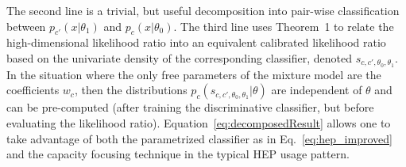 \documentclass[aoas,preprint]{imsart}
\numberwithin{equation}{section}
\theoremstyle{plain}
\begin{document}
The second line is a trivial, but useful decomposition into pair-wise classification between $p_{c'}(x|\theta_1)$ and $p_c(x|\theta_0)$.  The third line uses Theorem~1 to relate the high-dimensional likelihood ratio into an equivalent calibrated likelihood ratio based on the univariate density of the corresponding classifier, denoted $s_{c,c',\theta_0, \theta_1}$. In the situation where the only free parameters of the mixture model are the coefficients $w_c$, then the distributions $p_{c}(s_{c,c',\theta_0, \theta_1}| \theta)$ are independent of $\theta$ and can be pre-computed (after training the discriminative classifier, but before evaluating the  likelihood ratio). Equation~\ref{eq:decomposedResult} allows one to take advantage of both the parametrized classifier as in Eq.~\ref{eq:hep_improved} and the capacity focusing technique in the typical HEP usage pattern. 


%



\end{document}
